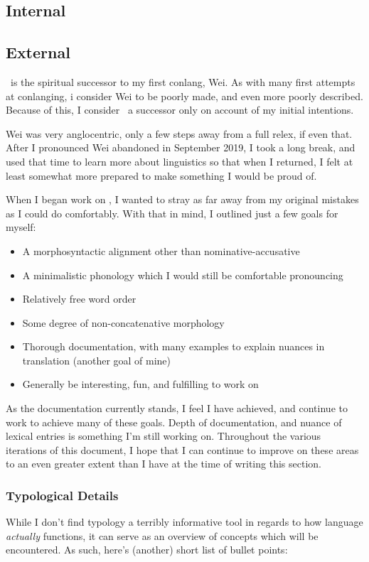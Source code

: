 \subsection{Internal}

\subsection{External}
\langname\ is the spiritual successor to my first conlang, Wei. As with many first attempts at conlanging, i consider Wei to be poorly made, and even more poorly described. Because of this, I consider \langname\ a successor only on account of my initial intentions.

Wei was very anglocentric, only a few steps away from a full relex, if even that. After I pronounced Wei abandoned in September 2019, I took a long break, and used that time to learn more about linguistics so that when I returned, I felt at least somewhat more prepared to make something I would be proud of.

When I began work on \langname , I wanted to stray as far away from my original mistakes as I could do comfortably. With that in mind, I outlined just a few goals for myself:

\begin{itemize}
  \item A morphosyntactic alignment other than nominative-accusative
  \item A minimalistic phonology which I would still be comfortable pronouncing
  \item Relatively free word order
  \item Some degree of non-concatenative morphology
  \item Thorough documentation, with many examples to explain nuances in translation (another goal of mine)
  \item Generally be interesting, fun, and fulfilling to work on
\end{itemize}

As the documentation currently stands, I feel I have achieved, and continue to work to achieve many of these goals. Depth of documentation, and nuance of lexical entries is something I'm still working on. Throughout the various iterations of this document, I hope that I can continue to improve on these areas to an even greater extent than I have at the time of writing this section.\footnotemark

\subsubsection{Typological Details}
While I don't find typology a terribly informative tool in regards to how language \textit{actually} functions, it can serve as an overview of concepts which will be encountered. As such, here's (another) short list of bullet points:

